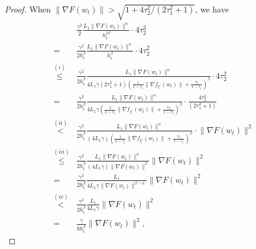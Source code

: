 \documentclass[10pt]{article} %
\newtheorem{proof}{Proof}
\begin{document}
\begin{proof}
    When $\big \|\nabla F(w_t) \big \| > \sqrt{1+{4\tau_2^2}/{(2\tau_1^2+1)}}$, we have
    \begin{align}
        &\frac{\gamma^2}{2} \frac{L_1 \big \|\nabla F(w_t) \big \|^{\alpha}}{h_t^{2\beta}}\cdot {4\tau_2^2} \nonumber\\
        =& \frac{\gamma^2}{2h_t^{\beta}} \frac{L_1 \big \|\nabla F(w_t) \big \|^{\alpha}}{h_t^{\beta}}\cdot {4\tau_2^2} \nonumber \\
        \overset{(i)}{\leq}&\frac{\gamma^2}{2h_t^{\beta}} \frac{L_1 \big \|\nabla F(w_t) \big \|^{\alpha}}{4L_1\gamma(2\tau_1^2+1)(\frac{1}{1-\tau_1}\|\nabla f_{\xi'}(w_t) \|+\frac{\tau_2}{1-\tau_1})^{\beta}}\cdot 4\tau_2^2 \nonumber \\
        =& \frac{\gamma^2}{2h_t^{\beta}} \frac{L_1 \big \|\nabla F(w_t) \big \|^{\alpha}}{4L_1\gamma(\frac{1}{1-\tau_1}\|\nabla f_{\xi'}(w_t) \|+\frac{\tau_2}{1-\tau_1})^{\beta}}\cdot \frac{4\tau_2^2}{(2\tau_1^2+1)} \nonumber \\
        \overset{(ii)}{<}& \frac{\gamma^2}{2h_t^{\beta}} \frac{L_1 \big \|\nabla F(w_t) \big \|^{\alpha}}{(4L_1\gamma)(\frac{1}{1-\tau_1}\big \|\nabla f_{\xi'}(w_t) \big \|+\frac{\tau_2}{1-\tau_1})^{\beta}} \cdot \big \|\nabla F(w_t) \big \|^2 \nonumber \\
        \overset{(iii)}{\leq}& \frac{\gamma^2}{2h_t^{\beta}} \frac{L_1 \big \|\nabla F(w_t) \big \|^{\alpha}}{(4L_1\gamma)\big \|\nabla F(w_t) \big \|^{\beta}} \big \| \nabla F(w_t)\big \|^2\nonumber \\
        =& \frac{\gamma^2}{2h_t^{\beta}}\frac{L_1}{4L_1\gamma \big \|\nabla F(w_t) \big \|^{\beta - \alpha}}\big \|\nabla F(w_t) \big \|^2 \nonumber \\
        \overset{(iv)}{<}& \frac{\gamma^2}{2h_t^{\beta}} \frac{L_1}{4L_1\gamma} \big \|\nabla F(w_t) \big \|^{2}\nonumber \\
        =& \frac{\gamma}{8h_t^{\beta}} \big \|\nabla F(w_t) \big \|^2, 

\end{align}
\end{proof}
\end{document}
